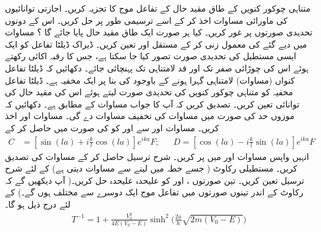  
متناہی چوکور کنویں کے طاق مقید حال کے تفاعل موج کا تجزیہ کریں۔ اجازتی توانائیوں کی ماورائی مساوات اخذ کر کے اسے ترسیمی طور پر حل کریں۔ اس کے دونوں تحدیدی صورتوں پر غور کریں۔ کیا ہر صورت ایک طاق مقید حال پایا جائے گا ؟ 
 مساوات میں دیے گئے  کی معمول زنی کر کے مستقل اور تعین کریں۔
ڈیراک ڈیلٹا تفاعل کو ایک ایسی مستطیل کی تحدیدی صورت تصور کیا جا سکتا ہے، جس کا رقبہ اکائی  رکھتے ہوئے اس کی چوڑائی صفر تک اور قد لامتناہی تک پہنچائی جائے۔ دکھائیں کہ ڈیلٹا تفاعل کنواں (مساوات) لامتناہی گہرا ہونے کے باوجود کی بنا پر ایک مخفیہ ہے۔ ڈیلٹا تفاعل مخفیہ کو متناہی چوکور کنویں کی تحدیدی صورت لیتے ہوئے اس کی مقید حال کی توانائی تعین کریں۔ تصدیق کریں کہ آپ کا جواب مساوات کے مطابق ہے۔ دکھائیں کہ موزوں حد کی صورت میں مساوات کی تخفیف مساوات دے گی۔
مساوات  اور  اخذ کریں۔ مساوات  اور سے  اور  کو  کی صورت میں حاصل کر کے
\begin{align*}
C&=[\sin(la)+i\frac{k}{l}\cos(la)]e^{ika}F; && D=[\cos(la)-i\frac{k}{l}\sin(la)]e^{ika}F
 \end{align*}
 انہیں واپس مساوات  اور  میں پر کریں۔ شرح ترسیل حاصل کر کے مساوات کی تصدیق کریں۔
مستطیلی رکاوٹ ( جسے خطہ میں لینے سے مساوات  دیتی ہے) کے لئے شرح ترسیل تعین کریں۔ تین صورتوں ،
اور  کو علیحدہ علیحدہ حل کریں۔( آپ دیکھیں گے کہ رکاوٹ کے اندر تینوں صورتوں میں تفاعل موج ایک دوسرے سے مختلف ہوں گے۔)   کے لئے درج ذیل ہو گا۔
\begin{align*}
T^{-1}=1+\frac{V_{0}^2}{4E(V_{0}-E)}\sinh^{2}\Big(\frac{2a}{\hslash}\sqrt{2m(V_{0}-E)} \Big) 
\end{align*}
